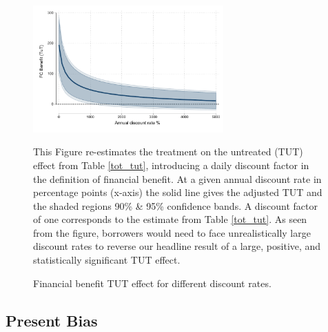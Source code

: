 \begin{appendix}
\begin{figure}[!h]
  \caption{Financial benefit TUT effect for different discount rates.}
    \begin{center}
        \centering
        \includegraphics[width=0.65\textwidth]{Figuras/discount_effect_tut.pdf}
    \end{center}
       \footnotesize{This Figure re-estimates the treatment on the untreated (TUT) effect from Table \ref{tot_tut}, introducing a daily discount factor in the definition of financial benefit.  At a given annual discount rate in percentage points (x-axis) the solid line gives the adjusted TUT and the shaded regions 90\% \& 95\% confidence bands. A discount factor of one corresponds to the estimate from Table \ref{tot_tut}. As seen from the figure, borrowers would need to face unrealistically large discount rates to reverse our headline result of a large, positive, and statistically significant TUT effect.}
        \label{fc_discount_rates}
\end{figure}

\normalsize
\normalsize


\subsection{Present Bias}\label{App_presentbias}


\end{appendix}
